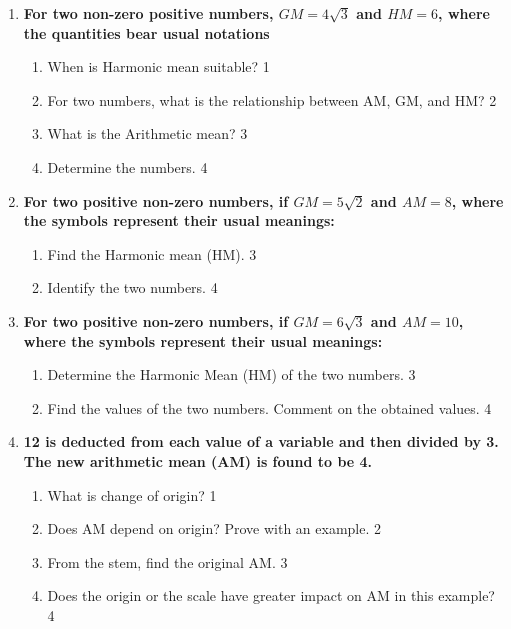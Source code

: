 \documentclass[a4paper,oneside]{book}
\begin{document}
\begin{enumerate}
 \item
	  \textbf{For two non-zero positive numbers, $GM=4\sqrt3$ and $HM=6$, where the quantities bear usual notations} 
  
  \begin{enumerate}
    \item
	When is Harmonic mean suitable? \hfill 1
    \item
	For two numbers, what is the relationship between AM, GM, and HM? \hfill 2
    \item  
	What is the Arithmetic mean? \hfill 3
    \item
	Determine the numbers. \hfill 4
  \end{enumerate}
  
  \item
\textbf{For two positive non-zero numbers, if $GM = 5\sqrt{2}$ and $AM = 8$, where the symbols represent their usual meanings:}

\begin{enumerate}
    \item  
    Find the Harmonic mean (HM). \hfill 3
    \item
    Identify the two numbers. \hfill 4
\end{enumerate}

\item
\textbf{For two positive non-zero numbers, if $GM = 6\sqrt{3}$ and $AM = 10$, where the symbols represent their usual meanings:}

\begin{enumerate}
    \item  
    Determine the Harmonic Mean (HM) of the two numbers. \hfill 3
    \item
    Find the values of the two numbers. Comment on the obtained values. \hfill 4
\end{enumerate}

  
   \item
	  \textbf{12 is deducted from each value of a variable and then divided by 3. The new arithmetic mean (AM) is found to be 4.} 
  
  \begin{enumerate}
    \item
	What is change of origin? \hfill 1
    \item
	Does AM depend on origin? Prove with an example. \hfill 2
    \item  
	From the stem, find the original AM. \hfill 3
    \item
	Does the origin or the scale have greater impact on AM in this example? \hfill 4
  \end{enumerate}
  

\end{enumerate}
\end{document}
